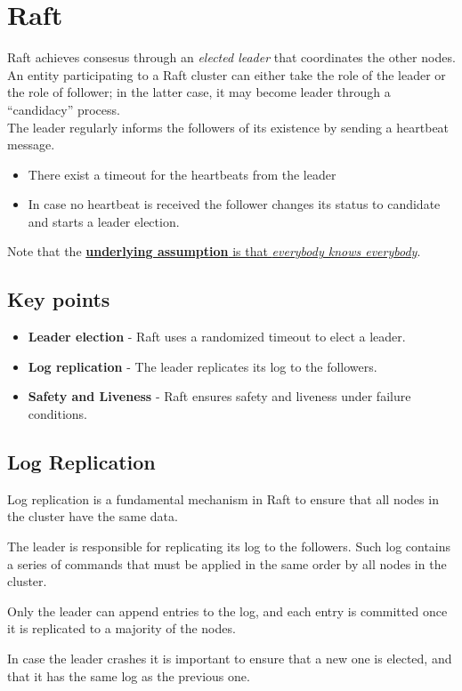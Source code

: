 \section{Raft}
Raft achieves consesus through an \textit{elected leader} that coordinates the other nodes.
An entity participating to a Raft cluster can either take the role of the leader or the role of follower;
in the latter case, it may become leader through a ``candidacy'' process.\\
The leader regularly informs the followers of its existence by sending a heartbeat message.
\begin{itemize}
   \item There exist a timeout for the heartbeats from the leader
   \item In case no heartbeat is received the follower changes its status to candidate and starts a leader election.
\end{itemize}

Note that the \ul{\textbf{underlying assumption} is that \textit{everybody knows everybody}}.

\subsection{Key points}
\begin{itemize}
   \item \textbf{Leader election} - Raft uses a randomized timeout to elect a leader.
   \item \textbf{Log replication} - The leader replicates its log to the followers.
   \item \textbf{Safety and Liveness} - Raft ensures safety and liveness under failure conditions.
\end{itemize}

\subsection{Log Replication}
Log replication is a fundamental mechanism in Raft to ensure that all nodes in the cluster have the same data.

The leader is responsible for replicating its log to the followers. Such log contains a series of commands that must be applied in the same order by all nodes in the cluster.

Only the leader can append entries to the log, and each entry is committed once it is replicated to a majority of the nodes.
\nl

In case the leader crashes it is important to ensure that a new one is elected, and that it has the same log as the previous one.


